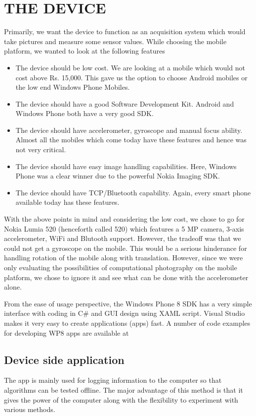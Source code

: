 \documentclass[BTech]{iitmdiss}
\begin{document}
\pagebreak
\chapter{THE DEVICE}
\label{chap:device}
Primarily, we want the device to function as an acquisition system which
would take pictures and measure some sensor values. While choosing the
mobile platform, we wanted to look at the following
features
\begin{itemize}
\item The device should be low cost. We are looking at a mobile which
would not cost above Rs. 15,000. This gave us the option to choose 
Android mobiles or the low end Windows Phone Mobiles.
\item The device should have a good Software Development Kit. Android
and Windows Phone both have a very good SDK.
\item The device should have accelerometer, gyroscope and manual focus
ability. Almost all the mobiles which come today have these features 
and hence was not very critical.
\item The device should have easy image handling capabilities. Here, 
Windows Phone was a clear winner due to the powerful Nokia Imaging SDK.
\item The device should have TCP/Bluetooth capability. Again, every 
smart phone available today has these features. 
\end{itemize}
 
With the above points in mind and considering the low cost, we chose to
go for Nokia Lumia 520 (henceforth called 520) which features a 5 MP
camera, 3-axis accelerometer, WiFi and Blutooth support. However, the 
tradeoff was that we could not get a gyroscope on the mobile. This 
would be a serious hinderance for handling rotation of the mobile along
with translation. However, since we were only evaluating the 
possibilities of computational photography on the mobile platform, we
chose to ignore it and see what can be done with the accelerometer 
alone. 

From the ease of usage perspective, the Windows Phone 8 SDK has a very
simple interface with coding in C\# and GUI design using XAML script. 
Visual Studio makes it very easy to create applications (apps) fast. A
number of code examples for developing WP8 apps are available at \cite{wp8:windowsphone8}

\section{Device side application}
\label{device:device_app}
The app is mainly used for logging information to the computer so that
algorithms can be tested offline. The major advantage of this method is
that it gives the power of the computer along with the flexibility to 
experiment with various methods. 
 
\end{document}
